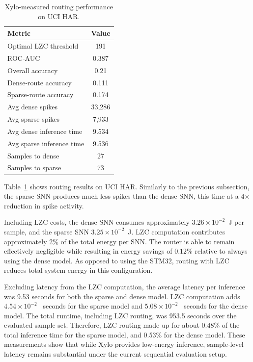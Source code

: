 \documentclass[conference]{IEEEtran}
\begin{document}
\begin{table}[H]
\centering
\caption{Xylo-measured routing performance on UCI HAR.}
\label{tab:xylo}
\begin{tabular}{lc}
\toprule
Metric & Value \\
\midrule
Optimal LZC threshold & 191 \\ %
ROC-AUC               & 0.387 \\
Overall accuracy      & 0.21 \\ 
Dense-route accuracy  & 0.111 \\ 
Sparse-route accuracy & 0.174 \\ 
Avg dense spikes      & 33,286 \\
Avg sparse spikes     & 7,933 \\
Avg dense inference time      & 9.534 \\
Avg sparse inference time     & 9.536 \\
Samples to dense      & 27 \\
Samples to sparse     & 73 \\
\bottomrule
\end{tabular}
\end{table}

Table~\ref{tab:xylo} shows routing results on UCI HAR. Similarly to the previous subsection, the sparse SNN produces much less spikes than the dense SNN, this time at a 4$\times$ reduction in spike activity.

Including LZC costs, the dense SNN consumes approximately $3.26\times10^{-2}$~J per sample, and the sparse SNN $3.25\times10^{-2}$~J. LZC computation contributes approximately 2\% of the total energy per SNN. The router is able to remain effectively negligible while resulting in energy savings of $0.12\%$ relative to always using the dense model. As opposed to using the STM32, routing with LZC reduces total system energy in this configuration.

Excluding latency from the LZC computation, the average latency per inference was 9.53 seconds for both the sparse and dense model. LZC computation adds $4.54\times10^{-2}$~ seconds for the sparse model and $5.08\times10^{-2}$~ seconds for the dense model. The total runtime, including LZC routing, was 953.5 seconds over the evaluated sample set. Therefore, LZC routing made up for about 0.48\% of the total inference time for the sparse model, and 0.53\% for the dense model. These measurements show that while Xylo provides low-energy inference, sample-level latency remains substantial under the current sequential evaluation setup.
\end{document}
